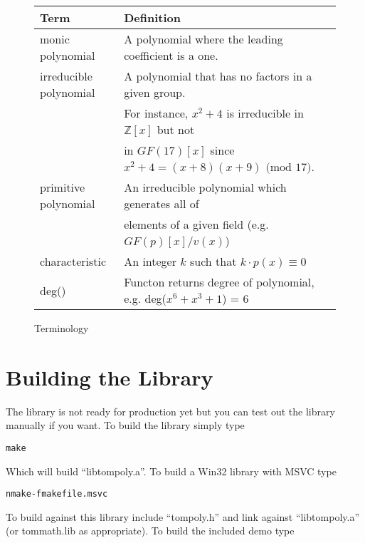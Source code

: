 \documentclass[b5paper]{book}
\def\Z{{\mathbb Z}}
\begin{document}
\begin{figure}[here]
\begin{center}
\begin{small}
\begin{tabular}{|l|l|}
\hline \textbf{Term} & \textbf{Definition} \\
\hline monic polynomial & A polynomial where the leading coefficient is a one. \\
\hline irreducible polynomial & A polynomial that has no factors in a given group.  \\
                              & For instance, $x^2 + 4$ is irreducible in $\Z[x]$ but not \\
                              & in $GF(17)[x]$ since $x^2 + 4 = (x+8)(x+9) \mbox{ (mod }17\mbox{)}$.  \\
\hline primitive polynomial   & An irreducible polynomial which generates all of \\
                              & elements of a given field (e.g. $GF(p)[x]/v(x)$) \\
\hline characteristic         & An integer $k$ such that $k \cdot p(x) \equiv 0$  \\
\hline deg()                  & Functon returns degree of polynomial, e.g. deg($x^6 + x^3 + 1$) = 6 \\
\hline
\end{tabular}
\end{small}
\end{center}
\caption{Terminology}
\end{figure} 

\section{Building the Library}
The library is not ready for production yet but you can test out the library manually if you want.  To build the library 
simply type

\begin{alltt}
make
\end{alltt}

Which will build ``libtompoly.a''.  To build a Win32 library with MSVC type

\begin{alltt}
nmake -f makefile.msvc
\end{alltt}

To build against this library include ``tompoly.h'' and link against ``libtompoly.a'' (or tommath.lib as appropriate).
To build the included demo type 
\end{document}
